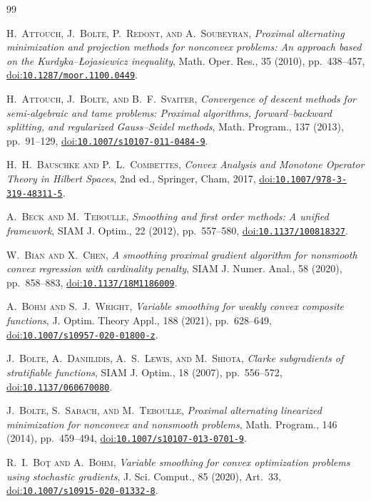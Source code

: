 \documentclass[9pt]{article}
\numberwithin{equation}{section}
\theoremstyle{definition}
\theoremstyle{remark}
\newcommand{\doi}[1]{\href{https://doi.org/#1}{doi:\nolinkurl{#1}}}
\begin{document}
\begin{thebibliography}{99}
\small

\textsc{H.~Attouch, J.~Bolte, P.~Redont, and A.~Soubeyran},
\emph{Proximal alternating minimization and projection methods for
nonconvex problems: An approach based on the Kurdyka--\L{}ojasiewicz
inequality}, Math. Oper. Res., 35 (2010), pp.~438--457,
\doi{10.1287/moor.1100.0449}.

\textsc{H.~Attouch, J.~Bolte, and B.~F.~Svaiter},
\emph{Convergence of descent methods for semi-algebraic and tame
problems: Proximal algorithms, forward--backward splitting, and
regularized Gauss--Seidel methods}, Math. Program., 137 (2013),
pp.~91--129, \doi{10.1007/s10107-011-0484-9}.

\textsc{H.~H.~Bauschke and P.~L.~Combettes},
\emph{Convex Analysis and Monotone Operator Theory in Hilbert Spaces},
2nd ed., Springer, Cham, 2017, \doi{10.1007/978-3-319-48311-5}.

\textsc{A.~Beck and M.~Teboulle},
\emph{Smoothing and first order methods: A unified framework},
SIAM J. Optim., 22 (2012), pp.~557--580, \doi{10.1137/100818327}.

\textsc{W.~Bian and X.~Chen},
\emph{A smoothing proximal gradient algorithm for nonsmooth convex
regression with cardinality penalty}, SIAM J. Numer. Anal.,
58 (2020), pp.~858--883, \doi{10.1137/18M1186009}.

\textsc{A.~B\"ohm and S.~J.~Wright},
\emph{Variable smoothing for weakly convex composite functions},
J. Optim. Theory Appl., 188 (2021), pp.~628--649,
\doi{10.1007/s10957-020-01800-z}.

\textsc{J.~Bolte, A.~Daniilidis, A.~S.~Lewis, and M.~Shiota},
\emph{Clarke subgradients of stratifiable functions},
SIAM J. Optim., 18 (2007), pp.~556--572, \doi{10.1137/060670080}.

\textsc{J.~Bolte, S.~Sabach, and M.~Teboulle},
\emph{Proximal alternating linearized minimization for nonconvex and
nonsmooth problems}, Math. Program., 146 (2014), pp.~459--494,
\doi{10.1007/s10107-013-0701-9}.

\textsc{R.~I.~Bo\c{t} and A.~B\"ohm},
\emph{Variable smoothing for convex optimization problems using
stochastic gradients}, J. Sci. Comput., 85 (2020), Art.~33,
\doi{10.1007/s10915-020-01332-8}.



\end{thebibliography}
\end{document}
